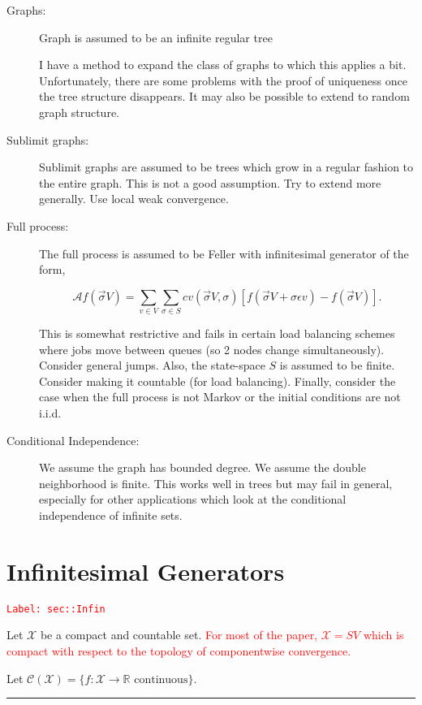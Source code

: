 \documentclass[12pt]{article}
\newcommand{\mb}{\mathbb}
\newcommand{\mc}{\mathcal}
\newcommand{\ra}{\rightarrow}
\newcommand{\te}{\text}
\newcommand{\ep}{\epsilon}
\newcommand{\tr}{\textcolor{red}}
\newcommand{\labe}[1]{\tr{\texttt{Label: #1}}}
\newcommand{\lin}{\rule{\linewidth}{0.4 pt}}
\renewcommand{\v}{v}							%
\renewcommand{\S}{S}							%
\newcommand{\s}{\sigma}							%
\newcommand{\sv}{\vec{\s}}						%
\newcommand{\ev}{\ep}							%
\newcommand{\IG}{\mc{A}}						%
\newcommand{\IGr}{c}							%
\newcommand{\cont}{\mc{C}}						%
\newcommand{\spce}{\mc{X}}						%
\begin{document}
\begin{description}
\item[Graphs: ] Graph is assumed to be an infinite regular tree

I have a method to expand the class of graphs to which this applies a bit. Unfortunately, there are some problems with the proof of uniqueness once the tree structure disappears. It may also be possible to extend to random graph structure.

\item[Sublimit graphs: ] Sublimit graphs are assumed to be trees which grow in a regular fashion to the entire graph. This is not a good assumption. Try to extend more generally. Use local weak convergence.

\item[Full process: ] The full process is assumed to be Feller with infinitesimal generator of the form,

\[\IG f(\sv{}{V}) = \sum_{\v \in V}\sum_{\s \in \S} \IGr{\v}(\sv{}{V},\s)[f(\sv{}{V} + \s \ev{\v}) - f(\sv{}{V})].\]

This is somewhat restrictive and fails in certain load balancing schemes where jobs move between queues (so 2 nodes change simultaneously). Consider general jumps. Also, the state-space \(\S\) is assumed to be finite. Consider making it countable (for load balancing). Finally, consider the case when the full process is not Markov or the initial conditions are not i.i.d.

\item[Conditional Independence: ] We assume the graph has bounded degree. We assume the double neighborhood is finite. This works well in trees but may fail in general, especially for other applications which look at the conditional independence of infinite sets.
\end{description}

\newpage
\appendix

\section{Infinitesimal Generators}
\label{sec::Infin}\labe{sec::Infin}

Let \(\spce\) be a compact and countable set. \tr{For most of the paper, \(\spce = \S{V}\) which is compact with respect to the topology of componentwise convergence.}

Let \(\cont(\spce)= \{f:\spce \ra \mb{R} \te{ continuous}\}\).

\lin
\end{document}
